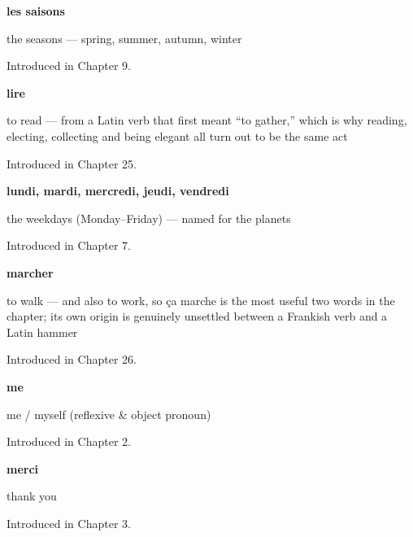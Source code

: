 \noindent\begin{minipage}[t]{\linewidth}
\raggedright
\textbf{les saisons}\par
\small the seasons — spring, summer, autumn, winter\par
\footnotesize Introduced in Chapter 9.
\end{minipage}\par\medskip

\noindent\begin{minipage}[t]{\linewidth}
\raggedright
\textbf{lire}\par
\small to read — from a Latin verb that first meant \textquotedblleft{}to gather,\textquotedblright{} which is why reading, electing, collecting and being elegant all turn out to be the same act\par
\footnotesize Introduced in Chapter 25.
\end{minipage}\par\medskip

\noindent\begin{minipage}[t]{\linewidth}
\raggedright
\textbf{lundi, mardi, mercredi, jeudi, vendredi}\par
\small the weekdays (Monday–Friday) — named for the planets\par
\footnotesize Introduced in Chapter 7.
\end{minipage}\par\medskip

\noindent\begin{minipage}[t]{\linewidth}
\raggedright
\textbf{marcher}\par
\small to walk — and also to work, so ça marche is the most useful two words in the chapter; its own origin is genuinely unsettled between a Frankish verb and a Latin hammer\par
\footnotesize Introduced in Chapter 26.
\end{minipage}\par\medskip

\noindent\begin{minipage}[t]{\linewidth}
\raggedright
\textbf{me}\par
\small me / myself (reflexive \& object pronoun)\par
\footnotesize Introduced in Chapter 2.
\end{minipage}\par\medskip

\noindent\begin{minipage}[t]{\linewidth}
\raggedright
\textbf{merci}\par
\small thank you\par
\footnotesize Introduced in Chapter 3.
\end{minipage}\par\medskip

